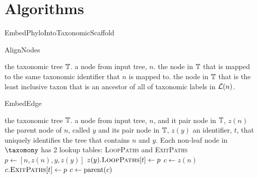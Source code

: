 \documentclass[11pt]{article}
\begin{document}
\newpage
\section{Algorithms}
\begin{algorithm} \caption{EmbedPhyloIntoTaxonomicScaffold}\label{embedTree} \begin{algorithmic}
\REQUIRE the taxonomic tree $\taxonomy$.
\REQUIRE an input tree, $T$ with a unique identifier $\mbox{id}(T)$
    \STATE{$z(n_i) \leftarrow \mbox{AlignNodes}(\taxonomy, n_i)$
\ENDFOR
\FOR{each node $n_i$ in $\nodes{T}$}
    \IF{$n_i \neq \treeRoot{T}$}
    \STATE $y_i \leftarrow \parent{n_i}$
    \STATE$\mbox{EmbedEdge}(\taxonomy, {y_i}, z(y_i), n_i, z(n_i), \mbox{id}(T))$
    \ENDIF
\ENDFOR
\end{algorithmic}\end{algorithm}
\begin{algorithm} \caption{AlignNodes}\label{alignNodes} \begin{algorithmic}
\REQUIRE the taxonomic tree $\taxonomy$.
\REQUIRE a node from input tree, $n$.
    \RETURN the node in $\taxonomy$ that is mapped to the same taxonomic identifier that $n$ is mapped to.
\ELSE
    \RETURN the node in $\taxonomy$ that is the least inclusive taxon that is an ancestor of all of 
    taxonomic labels in $\mathcal{L}(n)$.
\ENDIF
\end{algorithmic}\end{algorithm}
\begin{algorithm} \caption{EmbedEdge}\label{embedEdge} \begin{algorithmic}
\REQUIRE the taxonomic tree $\taxonomy$.
\REQUIRE a node from input tree, $n$, and it pair node in $\taxonomy$, $z(n)$
\REQUIRE the parent node of $n$, called $y$ and its pair node in $\taxonomy$, $z(y)$
\REQUIRE an identifier, $t$, that uniquely identifies the tree that contains $n$ and $y$.
\REQUIRE Each non-leaf node in $\taxomony$ has 2 lookup tables: \textsc{LoopPaths} and \textsc{ExitPaths}
\STATE $p \leftarrow \left[n, z(n), y, z(y)\right]$ 
    \STATE $z(y).\textsc{LoopPaths}[t] \leftarrow p$
\ELSE
    \STATE $c\leftarrow z(n)$
        \STATE $c.\textsc{ExitPaths}[t] \leftarrow p$
        \STATE $c \leftarrow \mbox{parent}(c)$
    \ENDWHILE
\ENDIF
\end{algorithmic}
\end{algorithm}
\end{document}
